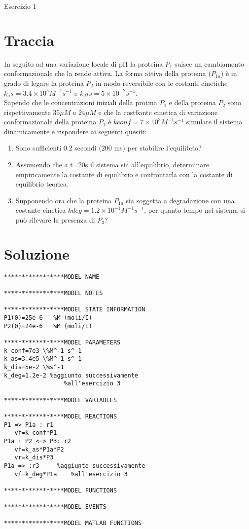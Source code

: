 \documentclass{article}
\begin{document}
\begin{center}
   \Huge
   Esercizio 1
\end{center}

\section*{Traccia}
In seguito ad una variazione locale di pH la proteina $P_1$ suisce un cambiamento conformazionale che la rende attiva. La forma attiva della proteina ($P_{1a}$)
è in grado di legare la proteina $P_2$ in modo reversibile con le costanti cinetiche $k_as = 3.4 \times 10^5 M^{-1}s^{-1}$ e $k_dis = 5 \times 10^{-2}s^{-1}$.\\
Sapendo che le concentrazioni iniziali della protina $P_1$ e della proteina $P_2$ sono rispettivamente $35 \mu M$ e $24 \mu M$ e che la cost6ante cinetica di variazione conformazionale della proteina $P_1$ è $kconf = 7 \times 10^3 M^{-1}s^{-1}$
simulare il sistema dinamicamente e rispondere ai seguenti quesiti:
\begin{enumerate}
   \item Sono sufficienti 0.2 secondi (200 ms) per stabilire l'equilibrio?
   \item Assumendo che a t=20s il sistema sia all'equilibrio, determinare empiricamente la costante di equilibrio e confrontarla con la costante di equilibrio teorica.
   \item Supponendo ora che la proteina $P_{1a}$ sia soggetta a degradazione con una costante cinetica $kdeg=1.2 \times 10^{-1} M^{-1}s^{-1}$, per quanto tempo nel sistema si può rilevare la presenza di $P_3$?
\end{enumerate}
\section*{Soluzione}
\begin{verbatim}
*****************MODEL NAME

*****************MODEL NOTES

*****************MODEL STATE INFORMATION
P1(0)=25e-6   %M (moli/I)
P2(0)=24e-6   %M (moli/I)

*****************MODEL PARAMETERS
k_conf=7e3 \%M^-1 s^-1
k_as=3.4e5 \%M^-1 s^-1
k_dis=5e-2 \%s^-1
k_deg=1.2e-2 %aggiunto successivamente
                 %all'esercizio 3

*****************MODEL VARIABLES

*****************MODEL REACTIONS
P1 => P1a : r1
   vf=k_conf*P1
P1a + P2 <=> P3: r2
   vf=k_as*P1a*P2
   vr=k_dis*P3
P1a => :r3     %aggiunto successivamente
   vf=k_deg*P1a    %all'esercizio 3

*****************MODEL FUNCTIONS

*****************MODEL EVENTS

*****************MODEL MATLAB FUNCTIONS
\end{verbatim}
\end{document}
